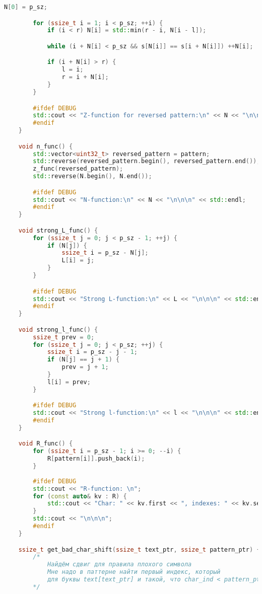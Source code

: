 \begin{lstlisting}[language=C++]
        N[0] = p_sz;

        for (ssize_t i = 1; i < p_sz; ++i) {
            if (i < r) N[i] = std::min(r - i, N[i - l]);

            while (i + N[i] < p_sz && s[N[i]] == s[i + N[i]]) ++N[i];

            if (i + N[i] > r) {
                l = i;
                r = i + N[i];
            }
        }

        #ifdef DEBUG
        std::cout << "Z-function for reversed pattern:\n" << N << "\n\n\n" << std::endl;
        #endif
    }

    void n_func() {
        std::vector<uint32_t> reversed_pattern = pattern;
        std::reverse(reversed_pattern.begin(), reversed_pattern.end());
        z_func(reversed_pattern);
        std::reverse(N.begin(), N.end());

        #ifdef DEBUG
        std::cout << "N-function:\n" << N << "\n\n\n" << std::endl;
        #endif
    }

    void strong_L_func() {
        for (ssize_t j = 0; j < p_sz - 1; ++j) {
            if (N[j]) {
                ssize_t i = p_sz - N[j];
                L[i] = j;
            }
        }

        #ifdef DEBUG
        std::cout << "Strong L-function:\n" << L << "\n\n\n" << std::endl;
        #endif
    }

    void strong_l_func() {
        ssize_t prev = 0;
        for (ssize_t j = 0; j < p_sz; ++j) {
            ssize_t i = p_sz - j - 1;
            if (N[j] == j + 1) {
                prev = j + 1;
            }
            l[i] = prev;
        }

        #ifdef DEBUG
        std::cout << "Strong l-function:\n" << l << "\n\n\n" << std::endl;
        #endif 
    }

    void R_func() {
        for (ssize_t i = p_sz - 1; i >= 0; --i) {
            R[pattern[i]].push_back(i);
        }
    
        #ifdef DEBUG
        std::cout << "R-function: \n";
        for (const auto& kv : R) {
            std::cout << "Char: " << kv.first << ", indexes: " << kv.second << std::endl;
        }
        std::cout << "\n\n\n";
        #endif 
    }

    ssize_t get_bad_char_shift(ssize_t text_ptr, ssize_t pattern_ptr) {
        /*
            Найдём сдвиг для правила плохого символа
            Мне надо в паттерне найти первый индекс, который
            для буквы text[text_ptr] и такой, что char_ind < pattern_ptr
        */


\end{lstlisting}
